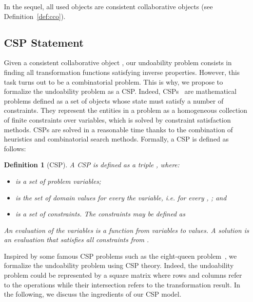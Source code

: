 \documentclass[submission,copyright,creativecommons]{eptcs}
\newtheorem{definition}{Definition}
\begin{document}
In the sequel, all used objects are consistent collaborative objects (see Definition~\ref{def:cco}). 
 
  
\subsection{CSP Statement}
Given a consistent collaborative object ,
our undoability problem consists in finding all transformation functions satisfying inverse
properties. However, this task  turns out to be a combinatorial problem. This is why, we propose to formalize the undoability problem as a CSP. Indeed, CSPs~\cite{CSP} are mathematical problems defined as a set of objects whose state must satisfy a number of constraints. 
They represent the entities in a problem as a homogeneous collection of finite constraints over variables, which is solved by constraint satisfaction methods.   CSPs  are solved in a reasonable time thanks to the combination of heuristics and combinatorial search methods.
Formally, a CSP is defined as follows:  

\begin{definition}[CSP]\label{def:csp}
A CSP is defined as a triple , where:
\begin{itemize}
\item  is a set of problem variables; \vspace{-1.5mm}
\item   is the set of   domain values for every the variable, \textit{i.e.} for every , ; and\vspace{-1.5mm} 
\item   is a set of constraints. The  constraints may  be defined as    
\end{itemize} 
An evaluation of the variables is a function from variables to values. A solution is an evaluation that satisfies all constraints from .

\end{definition}





Inspired by some famous CSP problems such as the eight-queen problem~\cite{NQueen,Bell20091}, we  formalize the  undoability problem  using CSP theory. Indeed, the undoability problem could be represented by  a square matrix where rows and columns refer to the operations  while their intersection  refers to the transformation result. 
In the following,  we discuss the ingredients of our  CSP model.
\end{document}
